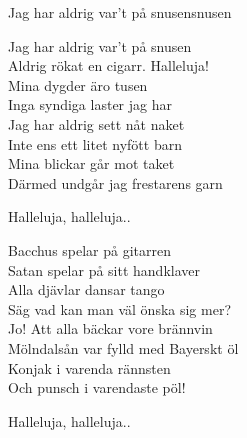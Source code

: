 \begin{song}{Jag har aldrig var't på snusen}{snusen}
\begin{vers}
Jag har aldrig var't på snusen\\
Aldrig rökat en cigarr. Halleluja!\\
Mina dygder äro tusen\\
Inga syndiga laster jag har\\
Jag har aldrig sett nåt naket\\
Inte ens ett litet nyfött barn\\
Mina blickar går mot taket\\
Därmed undgår jag frestarens garn\\
\end{vers}
\begin{vers}
Halleluja, halleluja..\\
\end{vers}
\begin{vers}
Bacchus spelar på gitarren\\
Satan spelar på sitt handklaver\\
Alla djävlar dansar tango\\
Säg vad kan man väl önska sig mer?\\
Jo! Att alla bäckar vore brännvin\\
Mölndalsån var fylld med Bayerskt öl\\
Konjak i varenda rännsten\\
Och punsch i varendaste pöl!\\
\end{vers}
\begin{vers}
Halleluja, halleluja..\\
\end{vers}
\end{song}
